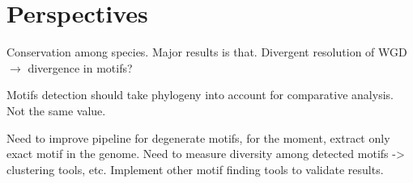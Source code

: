 \section{Perspectives}
Conservation among species. Major results is that. Divergent resolution of WGD $\rightarrow$ divergence in motifs?


Motifs detection should take phylogeny into account for comparative analysis. Not the same value.

Need to improve pipeline for degenerate motifs, for the moment, extract only exact motif in the genome.
Need to measure diversity among detected motifs -> clustering tools, etc.
Implement other motif finding tools to validate results.
